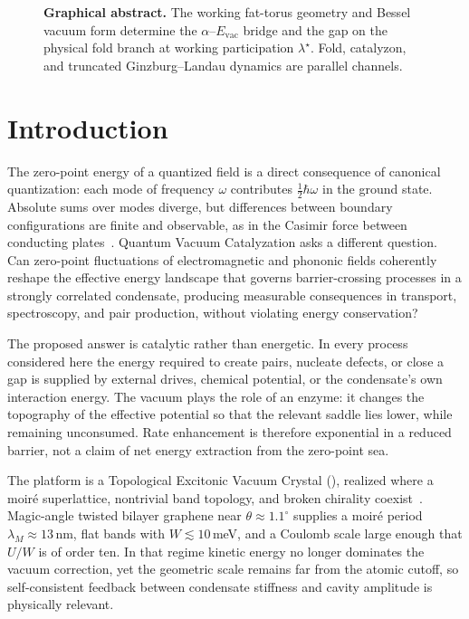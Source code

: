 \documentclass[11pt,letterpaper]{article}
\begin{document}
\begin{figure}[H]
\centering

\caption{\textbf{Graphical abstract.} The working fat-torus geometry and Bessel vacuum form determine the $\alpha$--$E_{\mathrm{vac}}$ bridge and the gap on the physical fold branch at working participation $\lambda^\star$. Fold, catalyzon, and truncated Ginzburg--Landau dynamics are parallel channels.}
\label{fig:graphical}
\end{figure}

\section{Introduction}
\label{sec:intro}

The zero-point energy of a quantized field is a direct consequence of canonical quantization: each mode of frequency $\omega$ contributes $\tfrac12\hbar\omega$ in the ground state. Absolute sums over modes diverge, but differences between boundary configurations are finite and observable, as in the Casimir force between conducting plates~\cite{Casimir1948,Lamoreaux1997}. Quantum Vacuum Catalyzation asks a different question. Can zero-point fluctuations of electromagnetic and phononic fields coherently reshape the effective energy landscape that governs barrier-crossing processes in a strongly correlated condensate, producing measurable consequences in transport, spectroscopy, and pair production, without violating energy conservation?

The proposed answer is catalytic rather than energetic. In every process considered here the energy required to create pairs, nucleate defects, or close a gap is supplied by external drives, chemical potential, or the condensate's own interaction energy. The vacuum plays the role of an enzyme: it changes the topography of the effective potential so that the relevant saddle lies lower, while remaining unconsumed. Rate enhancement is therefore exponential in a reduced barrier, not a claim of net energy extraction from the zero-point sea.

The platform is a Topological Excitonic Vacuum Crystal (\TEVC), realized where a moir\'e superlattice, nontrivial band topology, and broken chirality coexist~\cite{Cao2018correlated,Cao2018unconventional,Andrei2020,Balents2020,Regan2020,Tang2020,Gutierrez2016}. Magic-angle twisted bilayer graphene near $\theta\approx 1.1^\circ$ supplies a moir\'e period $\lambda_M\approx 13$\,nm, flat bands with $W\lesssim 10$\,meV, and a Coulomb scale large enough that $U/W$ is of order ten. In that regime kinetic energy no longer dominates the vacuum correction, yet the geometric scale remains far from the atomic cutoff, so self-consistent feedback between condensate stiffness and cavity amplitude is physically relevant.
\end{document}
